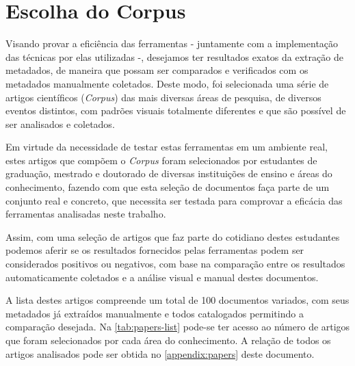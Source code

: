 \section{Escolha do Corpus}
\label{sec:corpus}


\begin{textedited}
Visando provar a eficiência das ferramentas - juntamente com a implementação das técnicas por elas utilizadas -, desejamos ter resultados exatos da extração de metadados, de maneira que possam ser comparados e verificados com os metadados manualmente coletados. Deste modo, foi selecionada uma série de artigos científicos (\emph{Corpus}) das mais diversas áreas de pesquisa, de diversos eventos distintos, com padrões visuais totalmente diferentes e que são possível de ser analisados e coletados.
\end{textedited}


\begin{textnew}
Em virtude da necessidade de testar estas ferramentas em um ambiente real, estes artigos que compõem o \emph{Corpus} foram selecionados por estudantes de graduação, mestrado e doutorado de diversas instituições de ensino e áreas do conhecimento, fazendo com que esta seleção de documentos faça parte de um conjunto real e concreto, que necessita ser testada para comprovar a eficácia das ferramentas analisadas neste trabalho.

Assim, com uma seleção de artigos que faz parte do cotidiano destes estudantes podemos aferir se os resultados fornecidos pelas ferramentas podem ser considerados positivos ou negativos, com base na comparação entre os resultados automaticamente coletados e a análise visual e manual destes documentos.
\end{textnew}


\begin{textedited}
A lista destes artigos compreende um total de 100 documentos variados, com seus metadados já extraídos manualmente e todos catalogados permitindo a comparação desejada. Na \autoref{tab:papers-list} pode-se ter acesso ao número de artigos que foram selecionados por cada área do conhecimento. A relação de todos os artigos analisados pode ser obtida no \autoref{appendix:papers} deste documento.
\end{textedited}

